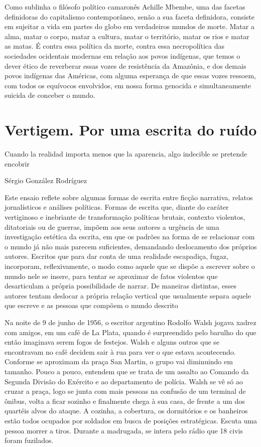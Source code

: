 Como sublinha o filósofo político camaronês Achille Mbembe, uma das
facetas definidoras do capitalismo contemporâneo, senão a sua faceta
definidora, consiste em sujeitar a vida em partes do globo em
verdadeiros mundos de morte. Matar a alma, matar o corpo, matar a
cultura, matar o território, matar os rios e matar as matas. É contra
essa política da morte, contra essa necropolítica das sociedades
ocidentais modernas em relação aos povos indígenas, que temos o dever
ético de reverberar essas vozes de resistência da Amazônia, e dos demais
povos indígenas das Américas, com alguma esperança de que essas vozes
ressoem, com todos os equívocos envolvidos, em nossa forma genocida e
simultaneamente suicida de conceber o mundo.

\chapter{Vertigem. Por uma escrita do ruído}

\epigraph{Cuando la realidad importa menos que la aparencia, algo indecible
se pretende encobrir}{Sérgio González Rodríguez}

Este ensaio reflete sobre algumas formas de escrita entre ficção
narrativa, relatos jornalísticos e análises políticas. Formas de escrita
que, diante do caráter vertiginoso e inebriante de transformação
políticas brutais, contexto violentos, ditatoriais ou de guerras, impõem
aos seus autores a urgência de uma investigação estética da escrita, em
que os padrões na forma de se relacionar com o mundo já não mais parecem
suficientes, demandando deslocamento dos próprios autores. Escritos que
para dar conta de uma realidade escapadiça, fugaz, incorporam,
reflexivamente, o modo como aquele que se dispõe a escrever sobre o
mundo nele se insere, para tentar se aproximar de fatos violentos que
desarticulam a própria possibilidade de narrar. De maneiras distintas,
esses autores tentam deslocar a própria relação vertical que usualmente
separa aquele que escreve e as pessoas que compõem o mundo descrito

\asterisc

Na noite de 9 de junho de 1956, o escritor argentino Rodolfo Walsh
jogava xadrez com amigos, em um café de La Plata, quando é surpreendido
pelo barulho do que então imaginava serem fogos de festejos. Walsh e
alguns outros que se encontravam no café decidem sair à rua para ver o
que estava acontecendo. Conforme se aproximam da praça San Martin, o
grupo vai diminuindo em tamanho. Pouco a pouco, entendem que se trata de
um assalto ao Comando da Segunda Divisão do Exército e ao departamento
de polícia. Walsh se vê só ao cruzar a praça, logo se junta com mais
pessoas na confusão de um terminal de ônibus, volta a ficar sozinho e
finalmente chega à sua casa, de frente a um dos quartéis alvos do
ataque. A cozinha, a cobertura, os dormitórios e os banheiros estão
todos ocupados por soldados em busca de posições estratégicas. Escuta
uma pessoa morrer a tiros. Durante a madrugada, se intera pelo rádio que
18 civis foram fuzilados.

